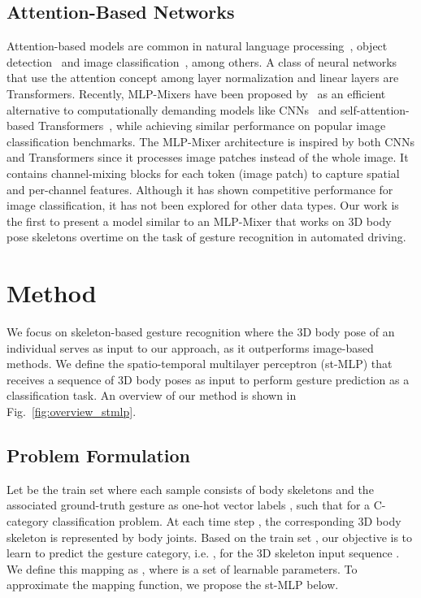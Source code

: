 \documentclass[letterpaper, 10 pt, conference]{ieeeconf}
\begin{document}
\subsection{Attention-Based Networks}
Attention-based models are common in natural language processing~\cite{vaswani2017attention, devlin2018bert, parikh2016decomposable}, object detection~\cite{ramachandran2019stand, carion2020end} and image classification~\cite{dosovitskiy2020image, wu2020visual}, among others. A class of neural networks that use the attention concept among layer normalization and linear layers are Transformers. Recently, MLP-Mixers have been proposed by~\cite{tolstikhin2021mlp} as an efficient alternative to computationally demanding models like CNNs~\cite{krizhevsky2012imagenet} and self-attention-based Transformers~\cite{vaswani2017attention}, while achieving similar performance on popular image classification benchmarks. The MLP-Mixer architecture is inspired by both CNNs and Transformers since it processes image patches instead of the whole image. It contains channel-mixing blocks for each token (image patch) to capture spatial and per-channel features. Although it has shown competitive performance for image classification, it has not been explored for other data types. Our work is the first to present a model similar to an MLP-Mixer that works on 3D body pose skeletons overtime on the task of gesture recognition in automated driving.


\section{Method}
\label{sec:method}
We focus on skeleton-based gesture recognition where the 3D body pose of an individual serves as input to our approach, as it outperforms image-based methods. We define the spatio-temporal multilayer perceptron (st-MLP) that receives a sequence of 3D body poses as input to perform gesture prediction as a classification task. An overview of our method is shown in Fig.~\ref{fig:overview_stmlp}.

\subsection{Problem Formulation}
\label{subsec:problem_formulation}
Let  be the train set where each sample consists of  body skeletons  and the associated ground-truth gesture as one-hot vector labels , such that  for a C-category classification problem. At each time step , the corresponding 3D body skeleton  is represented by  body joints. Based on the train set , our objective is to learn to predict the gesture category, i.e. , for the 3D skeleton input sequence . We define this mapping as , where  is a set of learnable parameters. To approximate the mapping function, we propose the st-MLP below.
\end{document}
